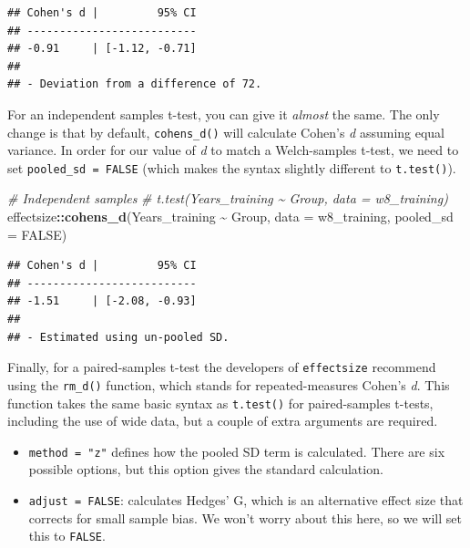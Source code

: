 \documentclass[
]{book}
\newenvironment{Shaded}{\begin{snugshade}}{\end{snugshade}}
\newcommand{\AttributeTok}[1]{\textcolor[rgb]{0.13,0.29,0.53}{#1}}
\newcommand{\CommentTok}[1]{\textcolor[rgb]{0.56,0.35,0.01}{\textit{#1}}}
\newcommand{\ConstantTok}[1]{\textcolor[rgb]{0.56,0.35,0.01}{#1}}
\newcommand{\FunctionTok}[1]{\textcolor[rgb]{0.13,0.29,0.53}{\textbf{#1}}}
\newcommand{\NormalTok}[1]{#1}
\newcommand{\SpecialCharTok}[1]{\textcolor[rgb]{0.81,0.36,0.00}{\textbf{#1}}}
\providecommand{\tightlist}{%
  \setlength{\itemsep}{0pt}\setlength{\parskip}{0pt}}
\begin{document}
\begin{verbatim}
## Cohen's d |         95% CI
## --------------------------
## -0.91     | [-1.12, -0.71]
## 
## - Deviation from a difference of 72.
\end{verbatim}

For an independent samples t-test, you can give it \emph{almost} the same. The only change is that by default, \texttt{cohens\_d()} will calculate Cohen's \emph{d} assuming equal variance. In order for our value of \emph{d} to match a Welch-samples t-test, we need to set \texttt{pooled\_sd\ =\ FALSE} (which makes the syntax slightly different to \texttt{t.test()}).

\begin{Shaded}
\begin{Highlighting}[]
\CommentTok{\# Independent samples}
\CommentTok{\# t.test(Years\_training \textasciitilde{} Group, data = w8\_training)}
\NormalTok{effectsize}\SpecialCharTok{::}\FunctionTok{cohens\_d}\NormalTok{(Years\_training }\SpecialCharTok{\textasciitilde{}}\NormalTok{ Group, }\AttributeTok{data =}\NormalTok{ w8\_training, }\AttributeTok{pooled\_sd =} \ConstantTok{FALSE}\NormalTok{)}
\end{Highlighting}
\end{Shaded}

\begin{verbatim}
## Cohen's d |         95% CI
## --------------------------
## -1.51     | [-2.08, -0.93]
## 
## - Estimated using un-pooled SD.
\end{verbatim}

Finally, for a paired-samples t-test the developers of \texttt{effectsize} recommend using the \texttt{rm\_d()} function, which stands for repeated-measures Cohen's \emph{d}. This function takes the same basic syntax as \texttt{t.test()} for paired-samples t-tests, including the use of wide data, but a couple of extra arguments are required.

\begin{itemize}
\tightlist
\item
  \texttt{method\ =\ "z"} defines how the pooled SD term is calculated. There are six possible options, but this option gives the standard calculation.
\item
  \texttt{adjust\ =\ FALSE}: calculates Hedges' G, which is an alternative effect size that corrects for small sample bias. We won't worry about this here, so we will set this to \texttt{FALSE}.
\end{itemize}
\end{document}
